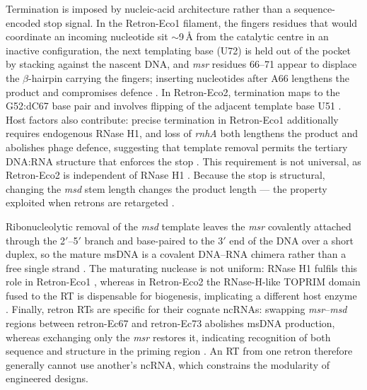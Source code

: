 Termination is imposed by nucleic-acid architecture rather than a sequence-encoded
stop signal. In the Retron-Eco1 filament, the fingers residues that would
coordinate an incoming nucleotide sit $\sim$9\,\AA{} from the catalytic centre in
an inactive configuration, the next templating base (U72) is held out of the pocket
by stacking against the nascent DNA, and \textit{msr} residues 66--71 appear to
displace the $\beta$-hairpin carrying the fingers; inserting nucleotides after A66
lengthens the product and compromises defence \cite{carabias2024}. In Retron-Eco2,
termination maps to the G52:dC67 base pair and involves flipping of the adjacent
template base U51 \cite{jasnauskaite2026}. Host factors also contribute: precise
termination in Retron-Eco1 additionally requires endogenous RNase H1, and loss of
\textit{rnhA} both lengthens the product and abolishes phage defence, suggesting
that template removal permits the tertiary DNA:RNA structure that enforces the stop
\cite{palka2022}. This requirement is not universal, as Retron-Eco2 is independent
of RNase H1 \cite{palka2022,jasnauskaite2026}. Because the stop is structural,
changing the \textit{msd} stem length changes the product length --- the property
exploited when retrons are retargeted \cite{lopez2022,crawford2025}.

Ribonucleolytic removal of the \textit{msd} template leaves the \textit{msr}
covalently attached through the 2$'$--5$'$ branch and base-paired to the 3$'$ end of
the DNA over a short duplex, so the mature msDNA is a covalent DNA--RNA chimera
rather than a free single strand \cite{palka2022,simon2019}. The maturating
nuclease is not uniform: RNase H1 fulfils this role in Retron-Eco1
\cite{palka2022}, whereas in Retron-Eco2 the RNase-H-like TOPRIM domain fused to
the RT is dispensable for biogenesis, implicating a different host enzyme
\cite{jasnauskaite2026}. Finally, retron RTs are specific for their cognate
ncRNAs: swapping \textit{msr}--\textit{msd} regions between retron-Ec67 and
retron-Ec73 abolishes msDNA production, whereas exchanging only the \textit{msr}
restores it, indicating recognition of both sequence and structure in the priming
region \cite{shimamoto1993}. An RT from one retron therefore generally cannot use
another's ncRNA, which constrains the modularity of engineered designs.




